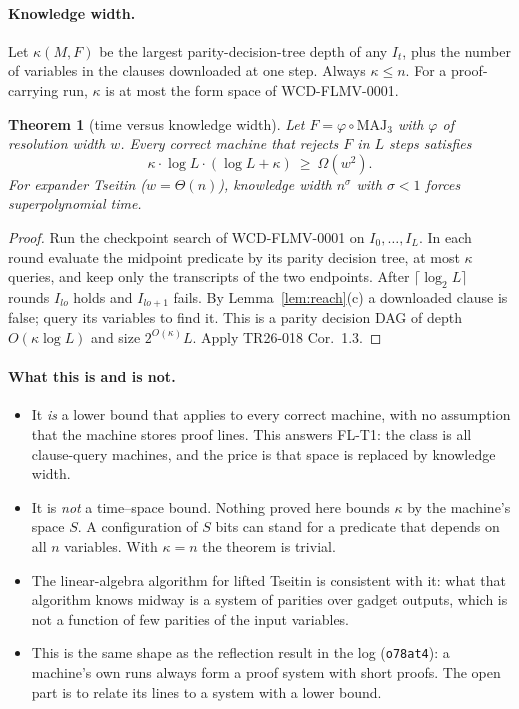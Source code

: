 \documentclass[11pt]{article}
\newtheorem{theorem}{Theorem}
\begin{document}
\paragraph{Knowledge width.} Let $\kappa(M,F)$ be the largest parity-decision-tree depth of any $I_t$, plus the number of variables in the clauses downloaded at one step. Always $\kappa\le n$. For a proof-carrying run, $\kappa$ is at most the form space of WCD-FLMV-0001.

\begin{theorem}[time versus knowledge width]\label{thm:kappa}
Let $F=\varphi\circ\mathrm{MAJ}_3$ with $\varphi$ of resolution width $w$. Every correct machine that rejects $F$ in $L$ steps satisfies
\[\kappa\cdot\log L\cdot(\log L+\kappa)\ \ge\ \Omega(w^2).\]
For expander Tseitin ($w=\Theta(n)$), knowledge width $n^{\sigma}$ with $\sigma<1$ forces superpolynomial time.
\end{theorem}
\begin{proof}
Run the checkpoint search of WCD-FLMV-0001 on $I_0,\dots,I_L$. In each round evaluate the midpoint predicate by its parity decision tree, at most $\kappa$ queries, and keep only the transcripts of the two endpoints. After $\lceil\log_2L\rceil$ rounds $I_{lo}$ holds and $I_{lo+1}$ fails. By Lemma~\ref{lem:reach}(c) a downloaded clause is false; query its variables to find it. This is a parity decision DAG of depth $O(\kappa\log L)$ and size $2^{O(\kappa)}L$. Apply TR26-018 Cor.~1.3.
\end{proof}

\paragraph{What this is and is not.}
\begin{itemize}
\item It \emph{is} a lower bound that applies to every correct machine, with no assumption that the machine stores proof lines. This answers FL-T1: the class is all clause-query machines, and the price is that space is replaced by knowledge width.
\item It is \emph{not} a time--space bound. Nothing proved here bounds $\kappa$ by the machine's space $S$. A configuration of $S$ bits can stand for a predicate that depends on all $n$ variables. With $\kappa=n$ the theorem is trivial.
\item The linear-algebra algorithm for lifted Tseitin is consistent with it: what that algorithm knows midway is a system of parities over gadget outputs, which is not a function of few parities of the input variables.
\item This is the same shape as the reflection result in the log (\texttt{o78at4}): a machine's own runs always form a proof system with short proofs. The open part is to relate its lines to a system with a lower bound.
\end{itemize}
\end{document}
